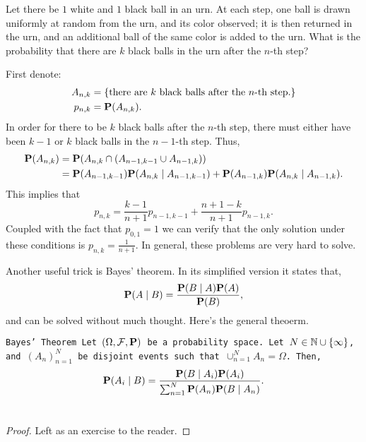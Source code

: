 \documentclass[11pt,a4paper]{article}
\begin{document}
  \begin{example}
     Let there be $1$ white and $1$ black ball in an urn. 
     At each step, one ball is drawn uniformly at random from the urn, 
     and its color observed; 
     it is then returned in the urn, 
     and an additional ball of the same color is added to the urn.
     What is the probability that there are $k$ black balls in the urn after
     the $n$-th step?

     First denote:
     \begin{align*}
       A_{n,k} &= \{\text{there are $k$ black balls after the $n$-th step.}\} \\
       p_{n,k} &= \mathbf{P}(A_{n,k}).
     \end{align*}
     In order for there to be $k$ black balls after the $n$-th step, there must
     either have been $k-1$ or $k$ black balls in the $n-1$-th step. Thus,
     \begin{align*}
       \mathbf{P}(A_{n,k}) &= 
       \mathbf{P}(A_{n,k} \cap (A_{n-1,k-1} \cup A_{n-1,k})) \\ &= 
       \mathbf{P}(A_{n-1,k-1}) \mathbf{P}(A_{n,k} \mid A_{n-1,k-1}) + 
       \mathbf{P}(A_{n-1,k}) \mathbf{P}(A_{n,k} \mid A_{n-1,k}).
     \end{align*}
     This implies that
     \[ p_{n,k}=\frac{k-1}{n+1}p_{n-1,k-1}+\frac{n+1-k}{n+1}p_{n-1,k}. \]
     Coupled with the fact that $p_{0,1} = 1$ we can verify that the only
     solution under these conditions is $p_{n,k} = \frac{1}{n+1}$.
     In general, these problems are very hard to solve.
  \end{example}

  Another useful trick is Bayes' theorem.
  In its simplified version it states that,
  \[
    {\bf P}(A \mid B)={\frac{{\bf P}(B \mid A){\bf P}(A)}{{\bf P}(B)}},
  \]
  and can be solved without much thought. Here's the general theoerm.

  \begin{theorem}\tt{Bayes' Theorem}
    Let $(\Omega, \mathcal F, \mathbf{P})$ be a probability space.
    Let $N \in \mathbb{N} \cup \{\infty\}$, and $(A_n)_{n=1}^{N}$ be disjoint events
    such that $\cup_{n=1}^{N} A_n = \Omega$. Then,
    \[
      \mathbf{P}(A_i \mid B) = 
      {\frac{\mathbf{P}(B \mid A_{i})\mathbf{P}(A_{i})}
      {\sum_{n=1}^{N}\mathbf{P}(A_{n})\mathbf{P}(B \mid A_{n})}}.
    \]
  \end{theorem}
  \begin{proof}
    Left as an exercise to the reader.
  \end{proof}
\end{document}

